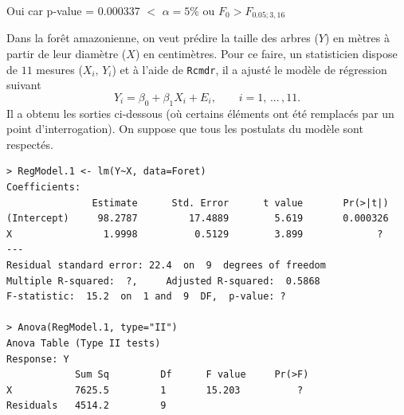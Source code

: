 \begin{questions}
\begin{parts}
\begin{solution} 
Oui car p-value = 0.000337 $<$ $\alpha=5\%$  ou $F_0 > F_{0.05; 3,16}$
\end{solution}




\end{parts}



\question\label{RegSimple} 
Dans la forêt amazonienne, on veut prédire la taille des arbres ($Y$) en mètres à partir de leur diamètre ($X$) en centimètres. Pour ce faire, un statisticien dispose de $11$ mesures ($X_i,\,Y_i$) et à l'aide de \texttt{Rcmdr}, il a ajusté le modèle de régression suivant
$$Y_i=\beta_0+\beta_1X_i+E_i,\qquad i=1,\,...\,,11.$$
Il a obtenu les sorties ci-dessous (où certains éléments ont été remplacés par un point d'interrogation). On suppose que tous les postulats du modèle sont respectés.

\begin{verbatim}
> RegModel.1 <- lm(Y~X, data=Foret)
Coefficients:
               Estimate      Std. Error      t value       Pr(>|t|)
(Intercept)     98.2787         17.4889        5.619       0.000326
X                1.9998          0.5129        3.899             ?
---
Residual standard error: 22.4  on  9  degrees of freedom
Multiple R-squared:  ?, 	Adjusted R-squared:  0.5868
F-statistic:  15.2  on  1 and  9  DF,  p-value: ?

> Anova(RegModel.1, type="II")
Anova Table (Type II tests)
Response: Y
            Sum Sq         Df      F value     Pr(>F)
X           7625.5         1       15.203          ?
Residuals   4514.2         9
\end{verbatim}


\end{questions}
